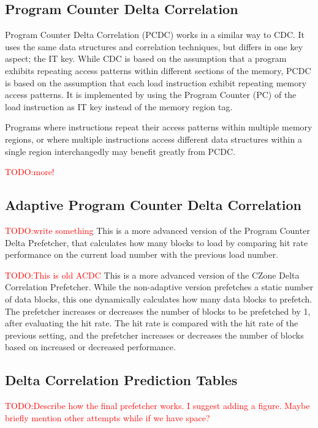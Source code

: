 \documentclass[a4paper]{IEEEtran}
\newcommand\TODO[1]{\textcolor{red}{TODO:#1}}
\newcommand\todo[1]{\TODO{#1}}
\begin{document}
\subsection{Program Counter Delta Correlation}

Program Counter Delta Correlation (PCDC) works in a similar way to CDC.
It uses the same data structures and correlation techniques, but differs in one key aspect; the IT key.
While CDC is based on the assumption that a program exhibits repeating access patterns within different sections of the memory, PCDC is based on the assumption that each load instruction exhibit repeating memory access patterns.
It is implemented by using the Program Counter (PC) of the load instruction as IT key instead of the memory region tag.

Programs where instructions repeat their access patterns within multiple memory regions, or where multiple instructions access different data structures within a single region interchangedly may benefit greatly from PCDC.

\todo{more!}

\subsection{Adaptive Program Counter Delta Correlation}

\todo{write something}
This is a more advanced version of the Program Counter Delta Prefetcher, that calculates how many blocks to load by comparing hit rate performance on the current load number with the previous load number.

\todo{This is old ACDC}
This is a more advanced version of the CZone Delta Correlation Prefetcher.
While the non-adaptive version prefetches a static number of data blocks, this one dynamically calculates how many data blocks to prefetch.
The prefetcher increases or decreases the number of blocks to be prefetched by 1, after evaluating the hit rate.
The hit rate is compared with the hit rate of the previous setting, and the prefetcher increases or decreases the number of blocks based on increased or decreased performance. 

\subsection{Delta Correlation Prediction Tables}

\todo{Describe how the final prefetcher works. I suggest adding a figure. Maybe briefly mention other attempts while if we have space?}
\end{document}
